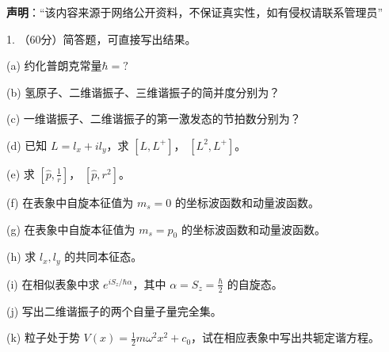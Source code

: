 
\textbf{声明}：“该内容来源于网络公开资料，不保证真实性，如有侵权请联系管理员”

1. （60分）简答题，可直接写出结果。

(a) 约化普朗克常量$\hbar = ?$

(b) 氢原子、二维谐振子、三维谐振子的简并度分别为？

(c) 一维谐振子、二维谐振子的第一激发态的节拍数分别为？

(d) 已知 $L = l_x + il_y $，求 $[L, L^+]$， $[L^2, L^+]$。

(e) 求 $[\hat p, \frac{1}{r}]$， $[\hat p, r^2]$。

(f) 在表象中自旋本征值为 $m_s = 0$ 的坐标波函数和动量波函数。

(g) 在表象中自旋本征值为 $m_s = p_0$ 的坐标波函数和动量波函数。

(h) 求 $l_x, l_y$ 的共同本征态。

(i) 在相似表象中求 $e^{iS_z/\hbar \alpha}$，其中 $\alpha = S_z =\frac{\hbar}{2} $ 的自旋态。

(j) 写出二维谐振子的两个自量子量完全集。

(k) 粒子处于势 $V(x) = \frac{1}{2}m\omega^2x^2 + c_0$，试在相应表象中写出共轭定谐方程。
